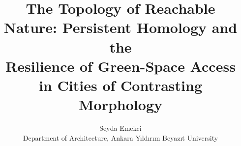 \documentclass[11pt]{article}
\title{The Topology of Reachable Nature: Persistent Homology and the\\
Resilience of Green-Space Access in Cities of Contrasting Morphology}
\author{Seyda Emekci\\
\small Department of Architecture, Ankara Y{\i}ld{\i}r{\i}m Beyaz{\i}t University}
\date{}
\begin{document}
\maketitle

\begin{abstract}

\end{abstract}





\end{document}
